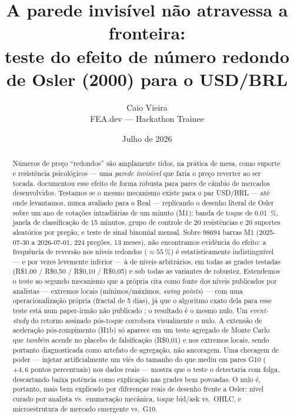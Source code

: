\documentclass[11pt,a4paper]{article}
\title{\textbf{A parede invisível não atravessa a fronteira:}\\
teste do efeito de número redondo de Osler (2000) para o USD/BRL}
\author{Caio Vieira\\ \small FEA.dev --- Hackathon Trainee}
\date{Julho de 2026}
\begin{document}
\maketitle

\begin{abstract}
\noindent
Números de preço ``redondos'' são amplamente tidos, na prática de mesa, como suporte e
resistência psicológicos --- uma \emph{parede invisível} que faria o preço reverter ao ser
tocada. \citet{osler2000} documentou esse efeito de forma robusta para pares de câmbio de
mercados desenvolvidos. Testamos se o mesmo mecanismo existe para o par
USD/BRL --- até onde levantamos, nunca avaliado para o Real --- replicando o desenho literal
de Osler sobre um ano de cotações intradiárias de um minuto (M1): banda de toque de
\SI{0.01}{\percent}, janela de classificação de 15 minutos, grupo de controle de 20
resistências e 20 suportes aleatórios por pregão, e teste de sinal binomial mensal.
Sobre \num{98694} barras M1 (2025-07-30 a 2026-07-01, \num{224} pregões, \num{13} meses),
não encontramos evidência do efeito: a frequência de reversão nos níveis redondos
($\approx \SI{55}{\percent}$) é estatisticamente indistinguível --- e por vezes levemente
inferior --- à de níveis arbitrários, em todas as grades testadas
(R\$1,00 / R\$0,50 / R\$0,10 / R\$0,05) e sob todas as variantes de robustez. Estendemos o
teste ao segundo mecanismo que a própria \citet{osler2000} cita como fonte dos níveis
publicados por analistas --- extremos locais (mínimos/máximos, \emph{swing points}) --- com
uma operacionalização própria (fractal de 5 dias), já que o algoritmo exato dela para esse
teste está num paper-irmão não publicado \citep{osler2000b}; o resultado é o mesmo nulo. Um
\emph{event-study} do retorno assinado pós-toque corrobora visualmente o nulo. A extensão de
aceleração pós-rompimento (H1b) só aparece em um teste agregado de Monte Carlo que
\emph{também} acende no placebo de falsificação (R\$0,01) e nos extremos locais, sendo
portanto diagnosticada como artefato de agregação, não ancoragem. Uma checagem de poder ---
injetar artificialmente um viés do tamanho do que \citet{osler2000} mediu em pares G10
($+4{,}6$ pontos percentuais) nos dados reais --- mostra que o teste o detectaria com folga,
descartando baixa potência como explicação nas grades bem povoadas. O nulo é, portanto, mais
bem explicado por diferenças reais de desenho frente a Osler: nível curado por analista vs.\
enumeração mecânica, toque bid/ask vs.\ OHLC, e microestrutura de mercado emergente vs.\ G10.
\end{abstract}
\end{document}
